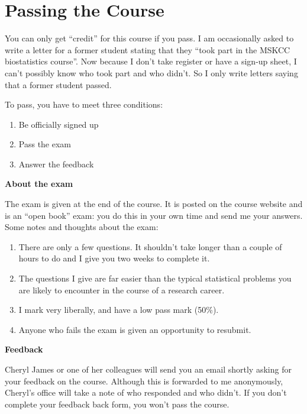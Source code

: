 \documentclass[]{book}
\providecommand{\tightlist}{%
  \setlength{\itemsep}{0pt}\setlength{\parskip}{0pt}}
\begin{document}
\hypertarget{passing-the-course}{%
\section*{Passing the Course}\label{passing-the-course}}

You can only get ``credit'' for this course if you pass. I am occasionally asked to write a letter for a former student stating that they ``took part in the MSKCC biostatistics course''. Now because I don't take register or have a sign-up sheet, I can't possibly know who took part and who didn't. So I only write letters saying that a former student passed.

To pass, you have to meet three conditions:

\begin{enumerate}
\def\labelenumi{\arabic{enumi}.}
\tightlist
\item
  Be officially signed up
\item
  Pass the exam
\item
  Answer the feedback
\end{enumerate}

\textbf{About the exam}

The exam is given at the end of the course. It is posted on the course website and is an ``open book'' exam: you do this in your own time and send me your answers. Some notes and thoughts about the exam:

\begin{enumerate}
\def\labelenumi{\arabic{enumi}.}
\tightlist
\item
  There are only a few questions. It shouldn't take longer than a couple of hours to do and I give you two weeks to complete it.
\item
  The questions I give are far easier than the typical statistical problems you are likely to encounter in the course of a research career.
\item
  I mark very liberally, and have a low pass mark (50\%).
\item
  Anyone who fails the exam is given an opportunity to resubmit.
\end{enumerate}

\textbf{Feedback}

Cheryl James or one of her colleagues will send you an email shortly asking for your feedback on the course. Although this is forwarded to me anonymously, Cheryl's office will take a note of who responded and who didn't. If you don't complete your feedback back form, you won't pass the course.
\end{document}
